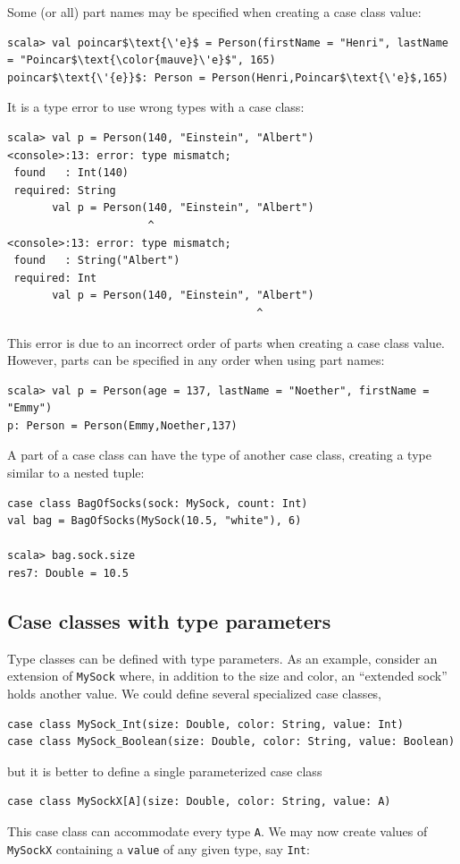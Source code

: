 Some (or all) part names may be specified when creating a case class
value:
\begin{lstlisting}[extendedchars=true,mathescape=true]
scala> val poincar$\text{\'e}$ = Person(firstName = "Henri", lastName = "Poincar$\text{\color{mauve}\'e}$", 165)
poincar$\text{\'{e}}$: Person = Person(Henri,Poincar$\text{\'e}$,165)
\end{lstlisting}
It is a type error to use wrong types with a case class:
\begin{lstlisting}
scala> val p = Person(140, "Einstein", "Albert")
<console>:13: error: type mismatch;
 found   : Int(140)
 required: String
       val p = Person(140, "Einstein", "Albert")
                      ^
<console>:13: error: type mismatch;
 found   : String("Albert")
 required: Int
       val p = Person(140, "Einstein", "Albert")
                                       ^
\end{lstlisting}
This error is due to an incorrect order of parts when creating a case
class value. However, parts can be specified in any order when using
part names:
\begin{lstlisting}
scala> val p = Person(age = 137, lastName = "Noether", firstName = "Emmy")
p: Person = Person(Emmy,Noether,137)
\end{lstlisting}
A part of a case class can have the type of another case class, creating
a type similar to a nested tuple:
\begin{lstlisting}
case class BagOfSocks(sock: MySock, count: Int)
val bag = BagOfSocks(MySock(10.5, "white"), 6)

scala> bag.sock.size
res7: Double = 10.5
\end{lstlisting}


\subsection{Case classes with type parameters}

Type classes can be defined with type parameters.
As an example, consider an extension of \lstinline!MySock! where,
in addition to the size and color, an ``extended sock'' holds another
value. We could define several specialized case classes,
\begin{lstlisting}
case class MySock_Int(size: Double, color: String, value: Int)
case class MySock_Boolean(size: Double, color: String, value: Boolean)
\end{lstlisting}
but it is better to define a single parameterized case class
\begin{lstlisting}
case class MySockX[A](size: Double, color: String, value: A)
\end{lstlisting}
This case class can accommodate every type \lstinline!A!. We may
now create values of \lstinline!MySockX! containing a \lstinline!value!
of any given type, say \lstinline!Int!:

